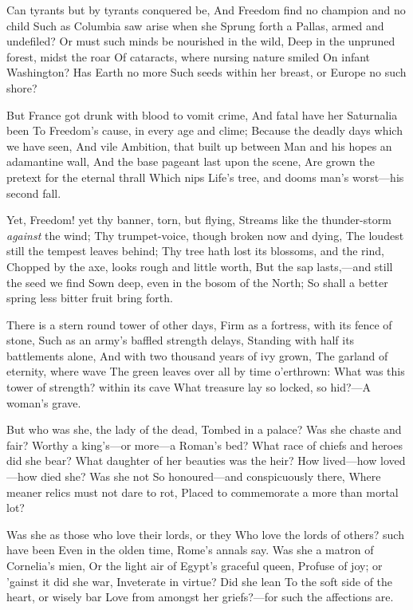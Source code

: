 \documentclass[10pt,twocolumn]{book}
\begin{document}
   Can tyrants but by tyrants conquered be,
   And Freedom find no champion and no child
   Such as Columbia saw arise when she
   Sprung forth a Pallas, armed and undefiled?
   Or must such minds be nourished in the wild,
   Deep in the unpruned forest, midst the roar
   Of cataracts, where nursing nature smiled
   On infant Washington?  Has Earth no more
Such seeds within her breast, or Europe no such shore?


   But France got drunk with blood to vomit crime,
   And fatal have her Saturnalia been
   To Freedom's cause, in every age and clime;
   Because the deadly days which we have seen,
   And vile Ambition, that built up between
   Man and his hopes an adamantine wall,
   And the base pageant last upon the scene,
   Are grown the pretext for the eternal thrall
Which nips Life's tree, and dooms man's worst---his second fall.

   Yet, Freedom! yet thy banner, torn, but flying,
   Streams like the thunder-storm \textit{against} the wind;
   Thy trumpet-voice, though broken now and dying,
   The loudest still the tempest leaves behind;
   Thy tree hath lost its blossoms, and the rind,
   Chopped by the axe, looks rough and little worth,
   But the sap lasts,---and still the seed we find
   Sown deep, even in the bosom of the North;
So shall a better spring less bitter fruit bring forth.


   There is a stern round tower of other days,
   Firm as a fortress, with its fence of stone,
   Such as an army's baffled strength delays,
   Standing with half its battlements alone,
   And with two thousand years of ivy grown,
   The garland of eternity, where wave
   The green leaves over all by time o'erthrown:
   What was this tower of strength? within its cave
What treasure lay so locked, so hid?---A woman's grave.


   But who was she, the lady of the dead,
   Tombed in a palace?  Was she chaste and fair?
   Worthy a king's---or more---a Roman's bed?
   What race of chiefs and heroes did she bear?
   What daughter of her beauties was the heir?
   How lived---how loved---how died she?  Was she not
   So honoured---and conspicuously there,
   Where meaner relics must not dare to rot,
Placed to commemorate a more than mortal lot?


   Was she as those who love their lords, or they
   Who love the lords of others? such have been
   Even in the olden time, Rome's annals say.
   Was she a matron of Cornelia's mien,
   Or the light air of Egypt's graceful queen,
   Profuse of joy; or 'gainst it did she war,
   Inveterate in virtue?  Did she lean
   To the soft side of the heart, or wisely bar
Love from amongst her griefs?---for such the affections are.
\end{document}
